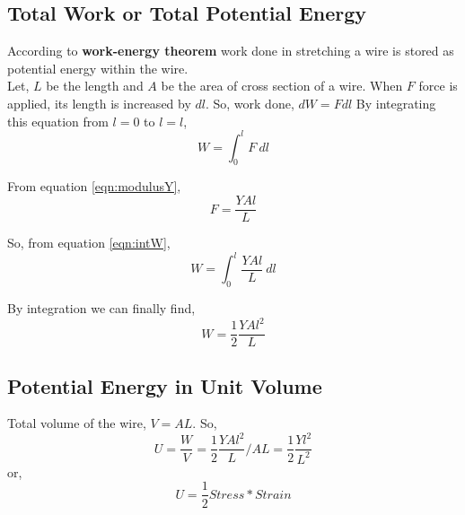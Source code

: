 \documentclass{article}
\begin{document}
    \subsection{Total Work or Total Potential Energy}
        According to \textbf{work-energy theorem} work done in stretching a wire is stored as potential energy within the wire. \\
        Let, $L$ be the length and $A$ be the area of cross section of a wire. When $F$ force is applied, its length is increased by $dl$. So, work done, $dW = F dl$ 
        By integrating this equation from $l=0$ to $l=l$,
        \begin{equation}
            W = \int_{0}^{l} F~dl
            \label{eqn:intW}
        \end{equation}
        
        From equation \ref{eqn:modulusY},
        \begin{equation}
            F = \frac{YAl}{L}
        \end{equation}
        
        So, from equation \ref{eqn:intW},
        \begin{equation}
            W = \int_{0}^{l} \frac{YAl}{L}~dl
        \end{equation}
        
        By integration we can finally find,
        \begin{equation}
            W = \frac{1}{2}\frac{YAl^2}{L}
        \end{equation}
    
    \subsection{Potential Energy in Unit Volume}
        Total volume of the wire, $V = AL$. So, 
        \begin{equation}
            U = \frac{W}{V} = \frac{1}{2}\frac{YAl^2}{L} / AL = \frac{1}{2}\frac{Yl^2}{L^2}
        \end{equation}
        or, 
        \begin{equation}
                U = \frac{1}{2} Stress * Strain
        \end{equation}
        
\end{document}
